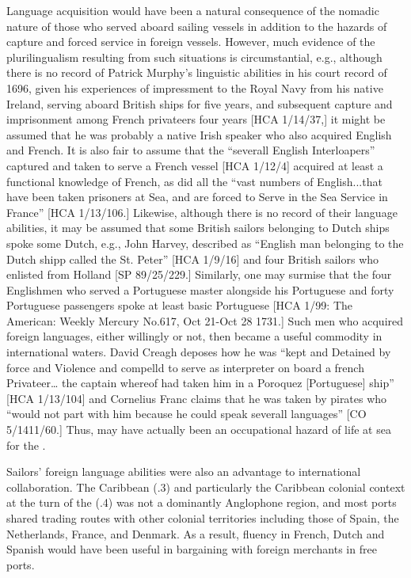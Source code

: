 Language acquisition would have been a natural consequence of the nomadic nature of those who served aboard sailing vessels in addition to the hazards of capture and forced service in foreign vessels. However, much evidence of the plurilingualism resulting from such situations is circumstantial, e.g., although there is no record of Patrick Murphy’s linguistic abilities in his court record of 1696, given his experiences of impressment to the Royal Navy from his native Ireland, serving aboard British ships for five years, and subsequent capture and imprisonment among French privateers four years [HCA 1/14/37,] it might be assumed that he was probably a native Irish speaker who also acquired English and French. It is also fair to assume that the “severall English Interloapers” captured and taken to serve a French vessel [HCA 1/12/4] acquired at least a functional knowledge of French, as did all the “vast numbers of English...that have been taken prisoners at Sea, and are forced to Serve in the Sea Service in France” [HCA 1/13/106.]  Likewise, although there is no record of their language abilities, it may be assumed that some British sailors belonging to Dutch ships spoke some Dutch, e.g., John Harvey, described as “English man belonging to the Dutch shipp called the St. Peter” [HCA 1/9/16] and four British sailors who enlisted from Holland [SP 89/25/229.] Similarly, one may surmise that the four Englishmen who served a Portuguese master alongside his Portuguese  and forty Portuguese passengers spoke at least basic Portuguese [HCA 1/99: The American: Weekly Mercury No.617, Oct 21-Oct 28 1731.] Such men who acquired foreign languages, either willingly or not, then became a useful commodity in international waters. David Creagh deposes how he was “kept and Detained by force and Violence and compelld to serve as interpreter on board a french Privateer… the captain whereof had taken him in a Poroquez [Portuguese] ship” [HCA 1/13/104] and Cornelius Franc claims that he was taken by pirates who “would not part with him because he could speak severall languages” [CO 5/1411/60.] Thus,  may have actually been an occupational hazard of life at sea for the . 

Sailors’ foreign language abilities were also an advantage to international collaboration. The Caribbean (.3) and particularly the Caribbean colonial context at the turn of the  (.4) was not a dominantly Anglophone region, and most ports shared trading routes with other colonial territories including those of Spain, the Netherlands, France, and Denmark. As a result, fluency in French, Dutch and Spanish would have been useful in bargaining with foreign merchants in free ports.

